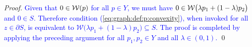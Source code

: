 \documentclass[smallextended]{svjour3}       %
\numberwithin{equation}{section}
\newcommand{\revision}[1]{\textcolor{blue}{#1}}
\begin{document}
\begin{proof}
  \revision{Given that $0\in\mathcal{W}(p)$ for all $p\in Y$, we must have $0\in\mathcal{W}\bigl(\lambda p_1 + (1-\lambda)p_2\bigr)$ and $0\in S$. Therefore condition (\ref{eq:graph:def:p:convexity}), when invoked for all $z\in\partial S$, is equivalent to  $\mathcal W\bigl(\lambda p_1 + (1-\lambda) p_2 \bigr) \subseteq S$. The proof is completed by applying the preceding argument for all $p_1,p_2\in Y$ and all $\lambda\in (0,1)$.}
\qed


\end{proof}
\end{document}

